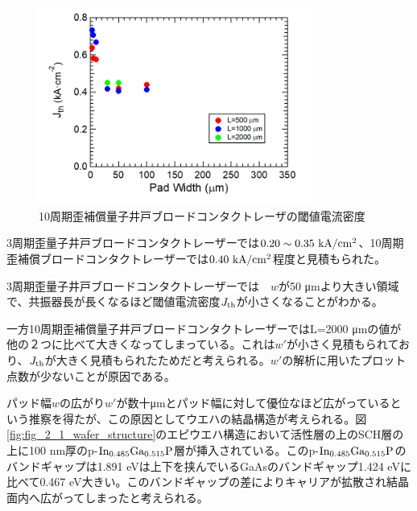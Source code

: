 \begin{figure}[ht]
	\centering
	\includegraphics[width=9cm]{figure/fig_3_1_10QW_broadcontact_Jth.png}
		\caption{10周期歪補償量子井戸ブロードコンタクトレーザの閾値電流密度}
		\label{fig:fig_3_1_10QW_broadcontact_Jth}
\end{figure}
3周期歪量子井戸ブロードコンタクトレーザーでは$0.20\sim 0.35\ \si{ \rm{  kA/cm^{2}}}$、10周期歪補償ブロードコンタクトレーザーでは$0.40\ \rm{  kA/cm^{2}}$程度と見積もられた。

3周期歪量子井戸ブロードコンタクトレーザーでは　$w$が50 \si{\micro\metre}より大きい領域で、共振器長が長くなるほど閾値電流密度$J_{\rm{th}}$が小さくなることがわかる。

一方10周期歪補償量子井戸ブロードコンタクトレーザーではL=2000 \si{\micro\metre}の値が他の２つに比べて大きくなってしまっている。これは$w'$が小さく見積もられており、$J_{\rm{th}}$が大きく見積もられたためだと考えられる。$w'$の解析に用いたプロット点数が少ないことが原因である。

パッド幅$w$の広がり$w'$が数十\si{\micro\metre}とパッド幅に対して優位なほど広がっているという推察を得たが、この原因としてウエハの結晶構造が考えられる。図\ref{fig:fig_2_1_wafer_structure}のエピウエハ構造において活性層の上のSCH層の上に100 nm厚のp-$\rm{In_{0.485}Ga_{0.515}P}$層が挿入されている。このp-$\rm{In_{0.485}Ga_{0.515}P}$のバンドギャップは1.891 eVは上下を挟んでいるGaAsのバンドギャップ1.424 eVに比べて0.467 eV大きい。このバンドギャップの差によりキャリアが拡散され結晶面内へ広がってしまったと考えられる。
\clearpage
